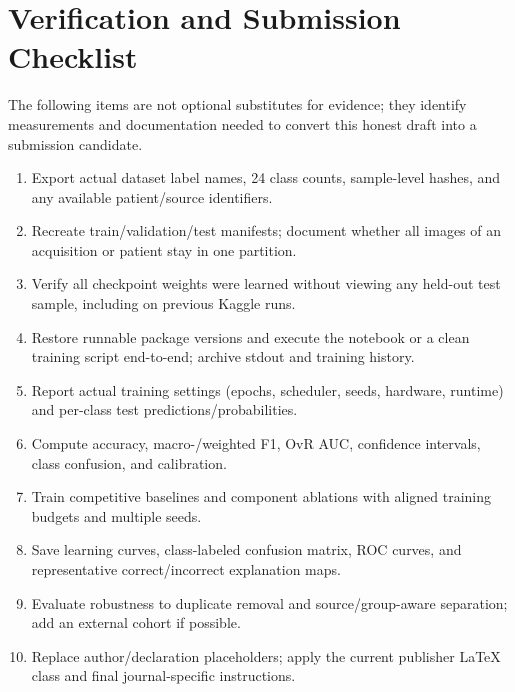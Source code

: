 \documentclass[11pt,a4paper]{article}
\begin{document}
\section{Verification and Submission Checklist}\label{app:checklist}
The following items are not optional substitutes for evidence; they identify measurements and documentation needed to convert this honest draft into a submission candidate.
\begin{enumerate}[leftmargin=*]
 \item Export actual dataset label names, 24 class counts, sample-level hashes, and any available patient/source identifiers.
 \item Recreate train/validation/test manifests; document whether all images of an acquisition or patient stay in one partition.
 \item Verify all checkpoint weights were learned without viewing any held-out test sample, including on previous Kaggle runs.
 \item Restore runnable package versions and execute the notebook or a clean training script end-to-end; archive stdout and training history.
 \item Report actual training settings (epochs, scheduler, seeds, hardware, runtime) and per-class test predictions/probabilities.
 \item Compute accuracy, macro-/weighted F1, OvR AUC, confidence intervals, class confusion, and calibration.
 \item Train competitive baselines and component ablations with aligned training budgets and multiple seeds.
 \item Save learning curves, class-labeled confusion matrix, ROC curves, and representative correct/incorrect explanation maps.
 \item Evaluate robustness to duplicate removal and source/group-aware separation; add an external cohort if possible.
 \item Replace author/declaration placeholders; apply the current publisher LaTeX class and final journal-specific instructions.
\end{enumerate}
\end{document}
